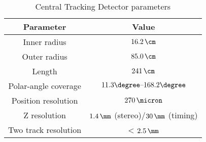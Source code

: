 \begin{table}[htbp]
	\centering
\begin{tabular}{ | c | c | }
     \hline
      Parameter & Value \\
			\hline
			\hline
			Inner radius & $16.2\,\cm$ \\ \hline
      Outer radius & $85.0\,\cm$  \\ \hline
			Length & $241\,\cm$ \\ \hline 
			Polar-angle coverage & $11.3\degree \mbox{--} 168.2\degree$ \\ \hline
			Position resolution & $270\,\micron$ \\ \hline
			Z resolution & $1.4\,\mm$ (stereo)/$30\,\mm$ (timing) \\ \hline
			Two track resolution & < $2.5\,\mm$ \\
      \hline
     \end{tabular}
	\caption{Central Tracking Detector parameters}
	\label{tab:ctdgeomparameters}
\end{table}
